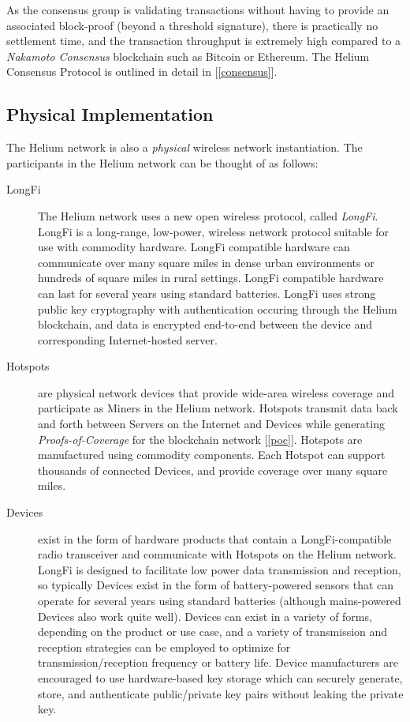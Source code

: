 \documentclass[10pt, nonatbib, nocopyrightspace, reprint]{sigplanconf}
\newcommand{\secref}[1]{[\autoref{#1}]}
\begin{document}
As the consensus group is validating transactions without having to provide an associated block-proof (beyond a threshold signature), there is practically no settlement time, and the transaction throughput is extremely high compared to a \emph{Nakamoto Consensus} blockchain such as Bitcoin or Ethereum. The Helium Consensus Protocol is outlined in detail in \secref{consensus}.

\subsection{Physical Implementation}

The Helium network is also a \emph{physical} wireless network instantiation. The participants in the Helium network can be thought of as follows:

\begin{description}
    \item [LongFi] The Helium network uses a new open wireless protocol, called \emph{LongFi}. LongFi is a long-range, low-power, wireless network protocol suitable for use with commodity hardware. LongFi compatible hardware can communicate over many square miles in dense urban environments or hundreds of square miles in rural settings. LongFi compatible hardware can last for several years using standard batteries. LongFi uses strong public key cryptography with authentication occuring through the Helium blockchain, and data is encrypted end-to-end between the device and corresponding Internet-hosted server.

    \item [Hotspots] are physical network devices that provide wide-area wireless coverage and participate as Miners in the Helium network. Hotspots transmit data back and forth between Servers on the Internet and Devices while generating \emph{Proofs-of-Coverage} for the blockchain network \secref{poc}. Hotspots are manufactured using commodity components. Each Hotspot can support thousands of connected Devices, and provide coverage over many square miles.

    \item [Devices] exist in the form of hardware products that contain a LongFi-compatible radio transceiver and communicate with Hotspots on the Helium network. LongFi is designed to facilitate low power data transmission and reception, so typically Devices exist in the form of battery-powered sensors that can operate for several years using standard batteries (although mains-powered Devices also work quite well). Devices can exist in a variety of forms, depending on the product or use case, and a variety of transmission and reception strategies can be employed to optimize for transmission/reception frequency or battery life. Device manufacturers are encouraged to use hardware-based key storage which can securely generate, store, and authenticate public/private key pairs without leaking the private key.
\end{description}
\end{document}
